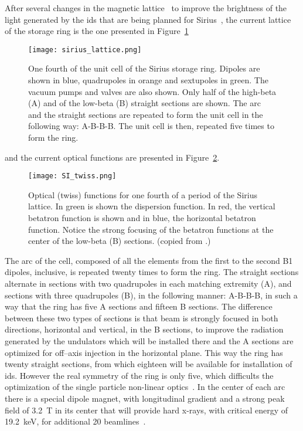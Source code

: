     After several changes in the magnetic lattice~\cite{Liu2014,Liu2015,Liu2016} to improve the brightness of the light generated by the \glspl{id} that are being planned for Sirius~\cite{Sirius2013,Vilela2017}, the current lattice of the storage ring is the one presented in Figure~\ref{fig:sirius_lattice}
    \begin{figure}
        \centering
        \texttt{[image: sirius\_lattice.png]}
        \caption[One fourth of the unit cell of the Sirius storage ring.]{One fourth of the unit cell of the Sirius storage ring. Dipoles are shown in blue, quadrupoles in orange and sextupoles in green. The vacuum pumps and valves are also shown. Only half of the high-beta (A) and of the low-beta (B) straight sections are shown. The arc and the straight sections are repeated to form the unit cell in the following way: A-B-B-B. The unit cell is then, repeated five times to form the ring.}
        \label{fig:sirius_lattice}
    \end{figure}
    and the current optical functions are presented in Figure~\ref{fig:sirius_twiss}.
    \begin{figure}
        \centering
        \texttt{[image: SI\_twiss.png]}
        \caption[Twiss functions of the Sirius storage ring.]{Optical (twiss) functions for one fourth of a period of the Sirius lattice. In green is shown the dispersion function. In red, the vertical betatron function is shown and in blue, the horizontal betatron function. Notice the strong focusing of the betatron functions at the center of the low-beta (B) sections. (copied from .)}
        \label{fig:sirius_twiss}
    \end{figure}
    The arc of the cell, composed of all the elements from the first to the second B1 dipoles, inclusive, is repeated twenty times to form the ring. The straight sections alternate in sections with two quadrupoles in each matching extremity (A), and sections with three quadrupoles (B), in the following manner: A-B-B-B, in such a way that the ring has five A sections and fifteen B sections. The difference between these two types of sections is that beam is strongly focused in both directions, horizontal and vertical, in the B sections, to improve the radiation generated by the undulators which will be installed there and the A sections are optimized for off--axis injection in the horizontal plane. This way the ring has twenty straight sections, from which eighteen will be available for installation of \glspl{id}. However the real symmetry of the ring is only five, which difficults the optimization of the single particle non-linear optics~\cite{Sa2016, Dester2017}. In the center of each arc there is a special dipole magnet, with longitudinal gradient and a strong peak field of \SI{3.2}{\tesla} in its center that will provide hard x-rays, with critical energy of \SI{19.2}{\kilo\electronvolt}, for additional 20 beamlines~\cite{Liu2016,Sirius2013}.

